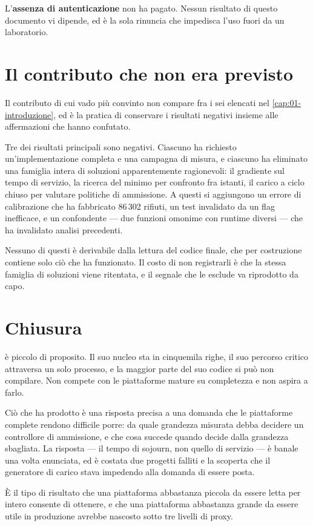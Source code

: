 L'\textbf{assenza di autenticazione} non ha pagato. Nessun risultato di questo
documento vi dipende, ed \`e la sola rinuncia che impedisca l'uso fuori da un
laboratorio.

\section{Il contributo che non era previsto}

Il contributo di cui vado pi\`u convinto non compare fra i sei elencati nel
\cref{cap:01-introduzione}, ed \`e la pratica di conservare i risultati negativi
insieme alle affermazioni che hanno confutato.

Tre dei risultati principali sono negativi. Ciascuno ha richiesto
un'implementazione completa e una campagna di misura, e ciascuno ha eliminato una
famiglia intera di soluzioni apparentemente ragionevoli: il gradiente sul tempo
di servizio, la ricerca del minimo per confronto fra istanti, il carico a ciclo
chiuso per valutare politiche di ammissione. A questi si aggiungono un errore di
calibrazione che ha fabbricato 86\,302 rifiuti, un test invalidato da un flag
inefficace, e un confondente --- due funzioni omonime con runtime diversi ---
che ha invalidato analisi precedenti.

Nessuno di questi \`e derivabile dalla lettura del codice finale, che per
costruzione contiene solo ci\`o che ha funzionato. Il costo di non registrarli \`e
che la stessa famiglia di soluzioni viene ritentata, e il segnale che le esclude
va riprodotto da capo.

\section{Chiusura}

\nf{} \`e piccolo di proposito. Il suo nucleo sta in cinquemila righe, il suo
percorso critico attraversa un solo processo, e la maggior parte del suo codice
si pu\`o non compilare. Non compete con le piattaforme mature su completezza e
non aspira a farlo.

Ci\`o che ha prodotto \`e una risposta precisa a una domanda che le piattaforme
complete rendono difficile porre: da quale grandezza misurata debba decidere un
controllore di ammissione, e che cosa succede quando decide dalla grandezza
sbagliata. La risposta --- il tempo di sojourn, non quello di servizio --- \`e
banale una volta enunciata, ed \`e costata due progetti falliti e la scoperta che
il generatore di carico stava impedendo alla domanda di essere posta.

\`E il tipo di risultato che una piattaforma abbastanza piccola da essere letta
per intero consente di ottenere, e che una piattaforma abbastanza grande da
essere utile in produzione avrebbe nascosto sotto tre livelli di proxy.
